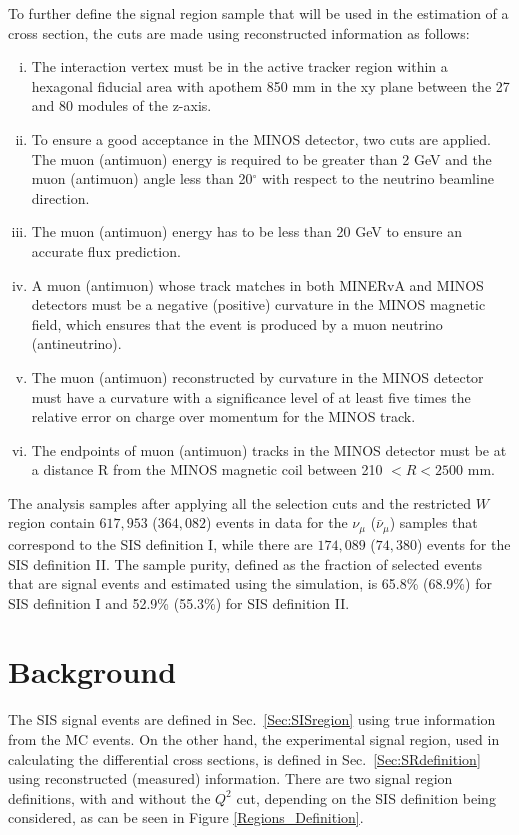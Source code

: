 \documentclass[aps, prd, twocolumn, showpacs, superscriptaddress, floatfix]{revtex4-2}
\begin{document}
To further define the signal region sample that will be used in the estimation of a cross section, the cuts are made using reconstructed information as follows:
\begin{enumerate}[(i)]
    \item The interaction vertex must be in the active tracker region within a hexagonal fiducial area with apothem 850 mm in the xy plane between the 27 and 80 modules of the z-axis. 
    \item To ensure a good acceptance in the MINOS detector, two cuts are applied. The muon (antimuon) energy is required to be greater than 2 GeV and the muon (antimuon) angle less than 20$^\circ$ with respect to the neutrino beamline direction.
    \item The muon (antimuon) energy has to be less than 20 GeV to ensure an accurate flux prediction. 
    \item A muon (antimuon) whose track matches in both MINERvA and MINOS detectors must be a negative (positive) curvature in the MINOS magnetic field, which ensures that the event is produced by a muon neutrino (antineutrino).
    \item The muon (antimuon) reconstructed by curvature in the MINOS detector must have a curvature with a significance level of at least five times the relative error on charge over momentum for the MINOS track.
    \item The endpoints of muon (antimuon) tracks in the MINOS detector must be at a distance R from the MINOS magnetic coil between 210 $< R < 2500$ mm.
\end{enumerate}

The analysis samples after applying all the selection cuts and the restricted $W$ region contain $617,953$ ($364,082$) events in data for the $\nu_\mu$ ($\bar{\nu}_\mu$) samples that correspond to the SIS definition I, while there are $174,089$ ($74,380$) events for the SIS definition II. The sample purity, defined as the fraction of selected events that are signal events and estimated using the simulation, is 65.8\% (68.9\%) for SIS definition I and 52.9\% (55.3\%) for SIS definition II.

\section{Background}
\label{Sec:Bkg}
The SIS signal events are defined in Sec.~\ref{Sec:SISregion} using true information from the MC events. On the other hand, the experimental signal region, used in calculating the differential cross sections, is defined in Sec.~\ref{Sec:SRdefinition} using reconstructed (measured) information. There are two signal region definitions, with and without the $Q^2$ cut, depending on the SIS definition being considered, as can be seen in Figure \ref{Regions_Definition}. 
\end{document}

